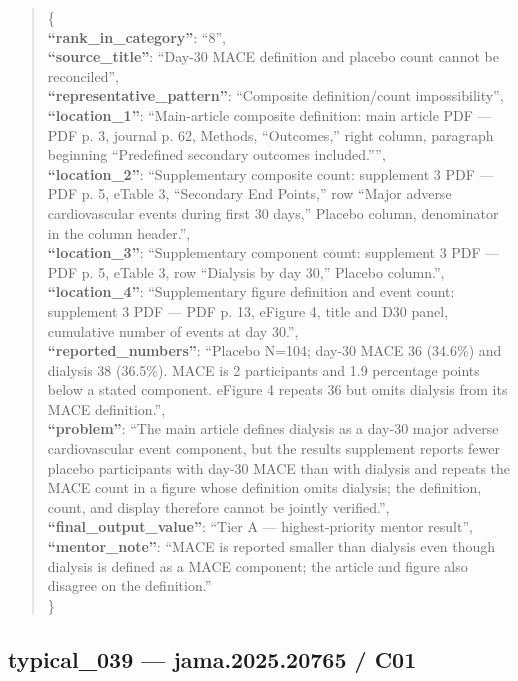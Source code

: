 \documentclass[
  letterpaper,
  9pt]{extreport}
\begin{document}
\begin{quote}
\{\\
\textbf{``rank\_in\_category''}: ``8'',\\
\textbf{``source\_title''}: ``Day-30 MACE definition and placebo count
cannot be reconciled'',\\
\textbf{``representative\_pattern''}: ``Composite definition/count
impossibility'',\\
\textbf{``location\_1''}: ``Main-article composite definition: main
article PDF --- PDF p. 3, journal p. 62, Methods, ``Outcomes,'' right
column, paragraph beginning ``Predefined secondary outcomes
included.'''',\\
\textbf{``location\_2''}: ``Supplementary composite count: supplement 3
PDF --- PDF p. 5, eTable 3, ``Secondary End Points,'' row ``Major
adverse cardiovascular events during first 30 days,'' Placebo column,
denominator in the column header.'',\\
\textbf{``location\_3''}: ``Supplementary component count: supplement 3
PDF --- PDF p. 5, eTable 3, row ``Dialysis by day 30,'' Placebo
column.'',\\
\textbf{``location\_4''}: ``Supplementary figure definition and event
count: supplement 3 PDF --- PDF p. 13, eFigure 4, title and D30 panel,
cumulative number of events at day 30.'',\\
\textbf{``reported\_numbers''}: ``Placebo N=104; day-30 MACE 36 (34.6\%)
and dialysis 38 (36.5\%). MACE is 2 participants and 1.9 percentage
points below a stated component. eFigure 4 repeats 36 but omits dialysis
from its MACE definition.'',\\
\textbf{``problem''}: ``The main article defines dialysis as a day-30
major adverse cardiovascular event component, but the results supplement
reports fewer placebo participants with day-30 MACE than with dialysis
and repeats the MACE count in a figure whose definition omits dialysis;
the definition, count, and display therefore cannot be jointly
verified.'',\\
\textbf{``final\_output\_value''}: ``Tier A --- highest-priority mentor
result'',\\
\textbf{``mentor\_note''}: ``MACE is reported smaller than dialysis even
though dialysis is defined as a MACE component; the article and figure
also disagree on the definition.''\\
\}
\end{quote}

\hypertarget{typical_039--jama202520765--c01}{%
\subsection{typical\_039 --- jama.2025.20765 /
C01}\label{typical_039--jama202520765--c01}}
\end{document}
